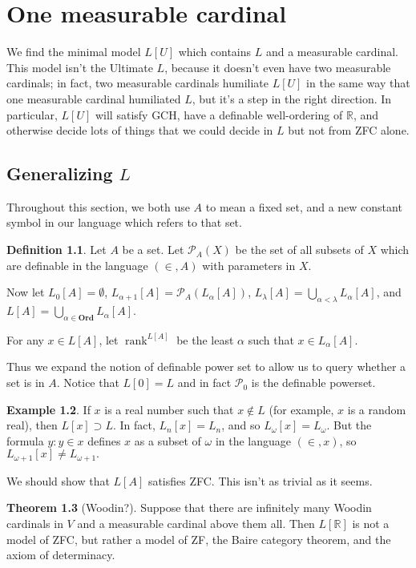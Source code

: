 \documentclass[12pt]{report}
\newcommand{\RR}{\mathbb{R}}
\newcommand{\pset}{\mathcal{P}}
\newcommand{\rank}{\operatorname{rank}}
\newcommand{\Ord}{\mathbf{Ord}}
\theoremstyle{definition}
\newtheorem{theorem}{Theorem}[chapter]
\newtheorem{definition}[theorem]{Definition}
\newtheorem{example}[theorem]{Example}
\begin{document}
\chapter{One measurable cardinal}
We find the minimal model $L[U]$ which contains $L$ and a measurable cardinal.
This model isn't the Ultimate $L$, because it doesn't even have two measurable cardinals; in fact, two measurable cardinals humiliate $L[U]$ in the same way that one measurable cardinal humiliated $L$, but it's a step in the right direction.
In particular, $L[U]$ will satisfy GCH, have a definable well-ordering of $\RR$, and otherwise decide lots of things that we could decide in $L$ but not from ZFC alone.

\section{Generalizing $L$}
Throughout this section, we both use $A$ to mean a fixed set, and a new constant symbol in our language which refers to that set.
\begin{definition}
Let $A$ be a set. Let $\pset_A(X)$ be the set of all subsets of $X$ which are definable in the language $(\in, A)$ with parameters in $X$.

Now let $L_0[A] = \emptyset$, $L_{\alpha + 1}[A] = \pset_A(L_\alpha[A])$, $L_\lambda[A] = \bigcup_{\alpha < \lambda} L_\alpha[A]$, and $L[A] = \bigcup_{\alpha \in \Ord} L_\alpha[A]$.

For any $x \in L[A]$, let $\rank^{L[A]}$ be the least $\alpha$ such that $x \in L_\alpha[A]$.
\end{definition}
Thus we expand the notion of definable power set to allow us to query whether a set is in $A$. Notice that $L[0] = L$ and in fact $\pset_0$ is the definable powerset.

\begin{example}
If $x$ is a real number such that $x \notin L$ (for example, $x$ is a random real), then $L[x] \supset L$. In fact, $L_n[x] = L_n$, and so $L_\omega[x] = L_\omega$. But the formula $y: y \in x$ defines $x$ as a subset of $\omega$ in the language $(\in, x)$, so $L_{\omega + 1}[x] \neq L_{\omega + 1}.$
\end{example}

We should show that $L[A]$ satisfies ZFC. This isn't as trivial as it seems.
\begin{theorem}[Woodin?]
Suppose that there are infinitely many Woodin cardinals in $V$ and a measurable cardinal above them all.
Then $L[\RR]$ is not a model of ZFC, but rather a model of ZF, the Baire category theorem, and the axiom of determinacy.
\end{theorem}
\end{document}
